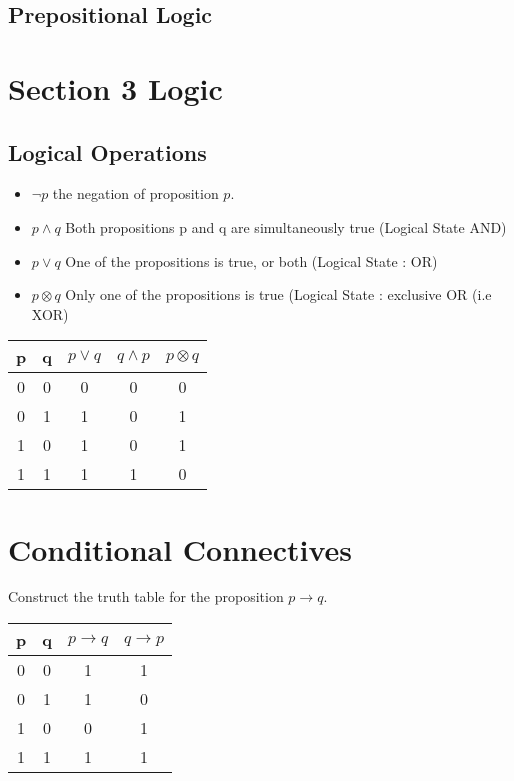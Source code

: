 \documentclass[12pt]{article} %
\begin{document}
\subsection*{Prepositional Logic}







\section{Section 3 Logic}
\subsection{Logical Operations}
\begin{itemize}
\item $\neg p$ the negation of proposition $p$.
\item $p \wedge q$ Both propositions p and q are simultaneously true (Logical State AND)
\item $p \vee q $ One of the propositions is true, or both (Logical State : OR)
\item $p \otimes q$ Only one of the propositions is true (Logical State : exclusive OR (i.e XOR)
\end{itemize}
\begin{center}
\begin{tabular}{|c|c|c|c|c|}
\hline
p & q & $p \vee q$ & $q \wedge p$ & $p \otimes q$ \\
\hline
0 & 0 & 0 & 0 & 0 \\
0 & 1 & 1 & 0 & 1\\
1 & 0 & 1 & 0 & 1 \\
1 & 1 & 1 & 1 & 0\\
\hline
\end{tabular}
\end{center}
\section{Conditional Connectives}
Construct the truth table for the proposition $p \rightarrow q$.

\begin{center}
\begin{tabular}{|c|c|c|c|}
\hline
p & q & $p \rightarrow q$ & $q \rightarrow p$ \\
\hline
0 & 0 & 1& 1 \\
0 & 1 & 1 & 0 \\
1 & 0 & 0 & 1 \\
1 & 1 & 1 & 1 \\
\hline
\end{tabular}
\end{center}
\end{document}

